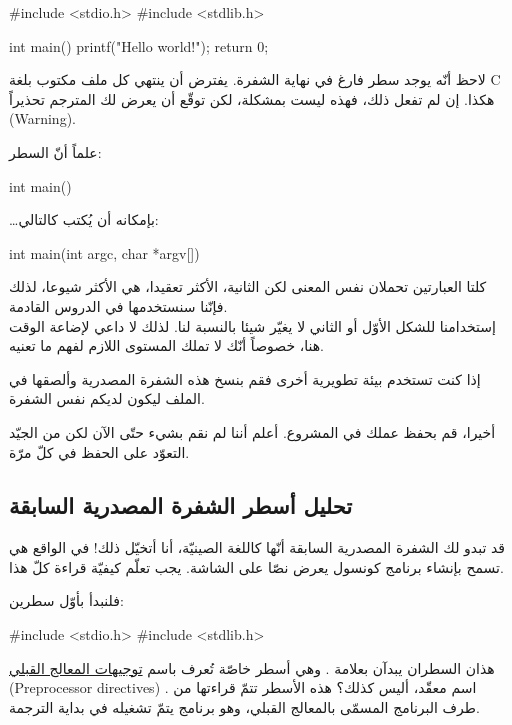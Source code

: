 \begin{Csource}
#include <stdio.h>
#include <stdlib.h>

int main()
{
    printf("Hello world!\n");
    return 0;
}

\end{Csource}

\begin{information}
لاحظ أنّه يوجد سطر فارغ في نهاية الشفرة. يفترض أن ينتهي كل ملف مكتوب بلغة C هكذا. إن لم تفعل ذلك، فهذه ليست بمشكلة، لكن توقّع أن يعرض لك المترجم تحذيراً
(\textenglish{Warning}).
\end{information}

علماً أنّ السطر:
\begin{Csource}
  int main()
\end{Csource}

…بإمكانه أن يُكتب كالتالي:
\begin{Csource}
  int main(int argc, char *argv[])
\end{Csource}

كلتا العبارتين تحملان نفس المعنى لكن الثانية، الأكثر تعقيدا، هي الأكثر شيوعا، لذلك فإنّنا سنستخدمها في الدروس القادمة.\\
إستخدامنا للشكل الأوّل أو الثاني لا يغيّر شيئا بالنسبة لنا. لذلك لا داعي لإضاعة الوقت هنا، خصوصاً أنّك لا تملك المستوى اللازم لفهم ما تعنيه.

إذا كنت تستخدم بيئة تطويرية أخرى فقم بنسخ هذه الشفرة المصدرية وألصقها في الملف  ليكون لديكم نفس الشفرة.

أخيرا، قم بحفظ عملك في المشروع. أعلم أننا لم نقم بشيء حتّى الآن لكن من الجيّد التعوّد على الحفظ في كلّ مرّة.

\subsection{تحليل أسطر الشفرة المصدرية السابقة}
قد تبدو لك الشفرة المصدرية السابقة أنّها كاللغة الصينيّة، أنا أتخيّل ذلك! في الواقع هي تسمح بإنشاء برنامج كونسول يعرض نصّا على الشاشة. يجب تعلّم كيفيّة قراءة كلّ هذا.

فلنبدأ بأوّل سطرين:
\begin{Csource}
#include <stdio.h>
#include <stdlib.h>
\end{Csource}

هذان السطران يبدآن بعلامة
\InlineCode{\#}.
وهي أسطر خاصّة تُعرف باسم
\underline{توجيهات المعالج القبلي}
(\textenglish{Preprocessor directives})
. اسم معقّد، أليس كذلك؟ هذه الأسطر تتمّ قراءتها من طرف البرنامج المسمّى بالمعالج القبلي، وهو برنامج يتمّ تشغيله في بداية الترجمة.


